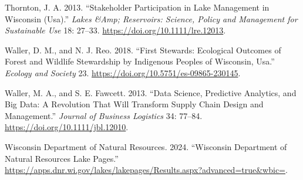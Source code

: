 \documentclass[
]{article}
\newlength{\cslhangindent}
\newenvironment{CSLReferences}[2] %
 {\begin{list}{}{%
  \setlength{\itemindent}{0pt}
  \setlength{\leftmargin}{0pt}
  \setlength{\parsep}{0pt}
  \ifodd #1
   \setlength{\leftmargin}{\cslhangindent}
   \setlength{\itemindent}{-1\cslhangindent}
  \fi
  \setlength{\itemsep}{#2\baselineskip}}}
 {\end{list}}
\begin{document}
\begin{CSLReferences}{1}{0}
Thornton, J. A. 2013. {``Stakeholder Participation in Lake Management in
Wisconsin (Usa).''} \emph{Lakes \&Amp; Reservoirs: Science, Policy and
Management for Sustainable Use} 18: 27--33.
\url{https://doi.org/10.1111/lre.12013}.

Waller, D. M., and N. J. Reo. 2018. {``First Stewards: Ecological
Outcomes of Forest and Wildlife Stewardship by Indigenous Peoples of
Wisconsin, Usa.''} \emph{Ecology and Society} 23.
\url{https://doi.org/10.5751/es-09865-230145}.

Waller, M. A., and S. E. Fawcett. 2013. {``Data Science, Predictive
Analytics, and Big Data: A Revolution That Will Transform Supply Chain
Design and Management.''} \emph{Journal of Business Logistics} 34:
77--84. \url{https://doi.org/10.1111/jbl.12010}.

Wisconsin Department of Natural Resources. 2024. {``Wisconsin Department
of Natural Resources Lake Pages.''}
\url{https://apps.dnr.wi.gov/lakes/lakepages/Results.aspx?advanced=true&wbic=}.

\end{CSLReferences}
\end{document}
